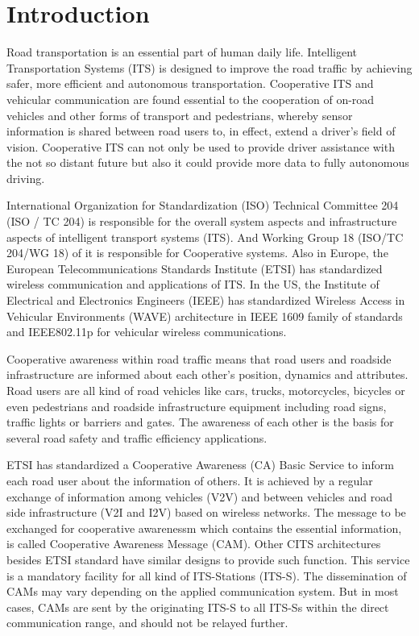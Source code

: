 \section{Introduction} \label{sec:intro}

Road transportation is an essential part of human daily life.
Intelligent Transportation Systems (ITS) is designed to improve the road traffic by achieving safer,
more efficient and autonomous transportation.
Cooperative ITS and vehicular communication are found essential to the
cooperation of on-road vehicles and other forms of transport and pedestrians,
whereby sensor information is shared between road users to,
in effect, extend a driver’s field of vision.
Cooperative ITS can not only be used to provide driver assistance with the not so distant future
but also it could provide more data to fully autonomous driving.

International Organization for Standardization (ISO) Technical Committee 204 (ISO / TC 204)
is responsible for the overall system aspects and infrastructure aspects of intelligent transport systems (ITS).
And Working Group 18 (ISO/TC 204/WG 18) of it is responsible for Cooperative systems.
Also in Europe, the European Telecommunications Standards Institute (ETSI) has standardized wireless communication and applications of ITS.
In the US, the Institute of Electrical and Electronics Engineers (IEEE) has standardized Wireless Access
in Vehicular Environments (WAVE) architecture in IEEE 1609 family of standards and IEEE802.11p for vehicular wireless communications.

Cooperative awareness within road traffic means that road users and
roadside infrastructure are informed about each other's position, dynamics and attributes.
Road users are all kind of road vehicles like cars, trucks, motorcycles, bicycles or even pedestrians
and roadside infrastructure equipment including road signs, traffic lights or barriers and gates.
The awareness of each other is the basis for several road safety and traffic efficiency applications.

ETSI has standardized a Cooperative Awareness (CA) Basic Service to inform each road user about the information of others.
It is achieved by a regular exchange of information among vehicles (V2V) and between vehicles
and road side infrastructure (V2I and I2V) based on wireless networks.
The message to be exchanged for cooperative awarenessm which contains the essential information,
is called Cooperative Awareness Message (CAM).
Other CITS architectures besides ETSI standard have similar designs to provide such function.
This service is a mandatory facility for all kind of ITS-Stations (ITS-S).
The dissemination of CAMs may vary depending on the applied communication system.
But in most cases, CAMs are sent by the originating ITS-S to all ITS-Ss within the direct communication range,
and should not be relayed further.

